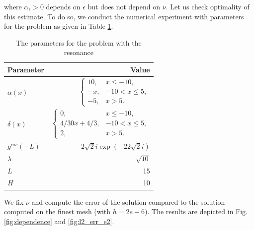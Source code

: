 where $\alpha_{\epsilon}>0$ depends on $\epsilon$ but does not depend on $\nu$. Let us check optimality of this estimate.  
To do so, we conduct the  numerical experiment with parameters for the problem as given in Table \ref{tab:parameters}.
\begin{table}
\begin{tabular}{l|r}
Parameter & Value \\
\hline
$\alpha(x)$ & $\left\{\begin{array}{cc}
10, & x\leq -10,\\
-x, & -10<x\leq 5,\\
-5, & x>5.
\end{array}\right.$ \\
$\delta(x)$ & 
$\left\{\begin{array}{cc}
0, & x\leq -10,\\
4/30x+4/3,& -10<x\leq 5,\\
2, & x>5.
\end{array}\right.$ \\
$g^{inc}(-L)$ & $-2 \sqrt{2}i\exp(-22\sqrt{2}i)$\\
$\lambda$ & 
$\sqrt{10}$\\
$L$& 15\\
$H$ & 10 \\
\end{tabular}
\caption{The parameters for the problem with the resonance}
\label{tab:parameters}
\end{table}
We fix $\nu$ and compute the error of the solution compared to the solution computed on the finest mesh  (with $h=2e-6$). 
 The results are depicted in Fig. \ref{fig:dependence} and \ref{fig:l2_err_e2}.
